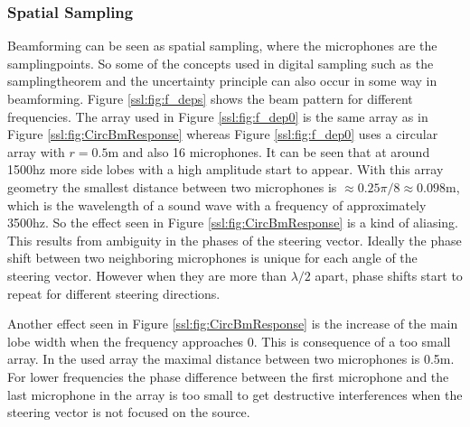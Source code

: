 \subsubsection{Spatial Sampling}
Beamforming can be seen as spatial sampling, where the microphones
are the samplingpoints.
So some of the concepts used in digital sampling such as 
the samplingtheorem and the uncertainty principle can also 
occur in some way in beamforming.
Figure \ref{ssl:fig:f_deps} shows the beam pattern for different frequencies.
The array used in Figure \ref{ssl:fig:f_dep0} is the same array
as in Figure \ref*{ssl:fig:CircBmResponse} whereas Figure \ref{ssl:fig:f_dep0}
uses a circular array with $r = 0.5$m and also 16 microphones. 
It can be seen that at around 1500hz more side lobes with a 
high amplitude start to appear. 
With this array geometry the smallest distance between two 
microphones is $\approx 0.25 \pi/8 \approx 0.098$m, which is the wavelength
of a sound wave with a frequency of approximately 3500hz.
So the effect seen in Figure \ref*{ssl:fig:CircBmResponse} is 
a kind of aliasing.
This results from ambiguity in the phases of the steering vector.
Ideally the phase shift between two neighboring microphones is unique
for each angle of the steering vector. 
However when they are more than $\lambda/2$ apart, phase shifts start to 
repeat for different steering directions.

Another effect seen in Figure \ref*{ssl:fig:CircBmResponse} is the increase
of the main lobe width when the frequency approaches 0.
This is consequence of a too small array. 
In the used array the maximal distance between two microphones is 0.5m.
For lower frequencies the phase difference between the first microphone and 
the last microphone in the array is too small to get destructive
interferences when the steering vector is not focused on the source.


